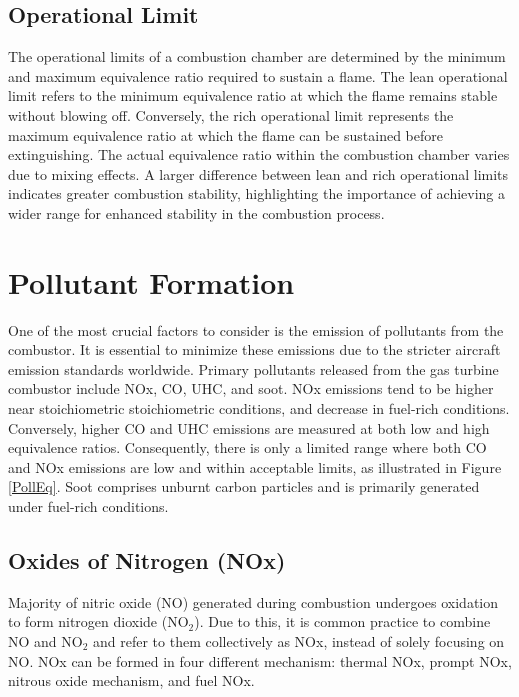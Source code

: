 \subsection{Operational Limit}
The operational limits of a combustion chamber are determined by the minimum and maximum equivalence ratio required to sustain a flame. The lean operational limit refers to the minimum equivalence ratio at which the flame remains stable without blowing off. Conversely, the rich operational limit represents the maximum equivalence ratio at which the flame can be sustained before extinguishing. The actual equivalence ratio within the combustion chamber varies due to mixing effects. A larger difference between lean and rich operational limits indicates greater combustion stability, highlighting the importance of achieving a wider range for enhanced stability in the combustion process.

\section{Pollutant Formation}
One of the most crucial factors to consider is the emission of pollutants from the combustor. It is essential to minimize these emissions due to the stricter aircraft emission standards worldwide. Primary pollutants released from the gas turbine combustor include NOx, CO, UHC, and soot. NOx emissions tend to be higher near stoichiometric stoichiometric conditions, and decrease in fuel-rich conditions. Conversely, higher CO and UHC emissions are measured at both low and high equivalence ratios. Consequently, there is only a limited range where both CO and NOx emissions are low and within acceptable limits, as illustrated in Figure \ref{PollEq}. Soot comprises unburnt carbon particles and is primarily generated under fuel-rich conditions.

\subsection{Oxides of Nitrogen (NOx)}
Majority of nitric oxide (NO) generated during combustion undergoes oxidation to form nitrogen dioxide (NO$_2$). Due to this, it is common practice to combine NO and NO$_2$ and refer to them collectively as NOx, instead of solely focusing on NO. NOx can be formed in four different mechanism: thermal NOx, prompt NOx, nitrous oxide mechanism, and fuel NOx.


